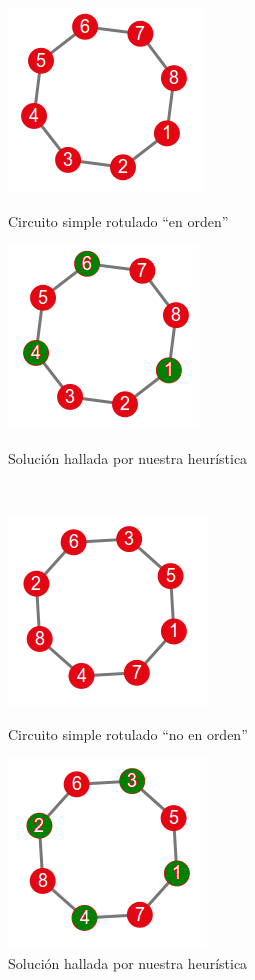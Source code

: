\begin{figure}[!htb]
\begin{center}
  \includegraphics[scale=0.8]{imagenes/faimilia2.png}
\end{center}
  \caption{Circuito simple rotulado ``en orden''}\label{fig:familia2}
\endminipage\hfill
{}
\begin{center}
  \includegraphics[scale=0.8]{imagenes/faimilia2-resopt.png}
\end{center}
  \caption{Solución hallada por nuestra heurística}\label{fig:familia2res}
\endminipage\\
\begin{center}
  \includegraphics[scale=1.0]{imagenes/faimilia2rename.png}
\end{center}
  \caption{Circuito simple rotulado ``no en orden''}\label{fig:familia2bis}
\endminipage\hfill
{}
\begin{center}
  \includegraphics[scale=1.0]{imagenes/faimilia2rename-solnoopt.png}
\end{center}
  \caption{Solución hallada por nuestra heurística}\label{fig:familia2bisres}
\endminipage
\end{figure}



